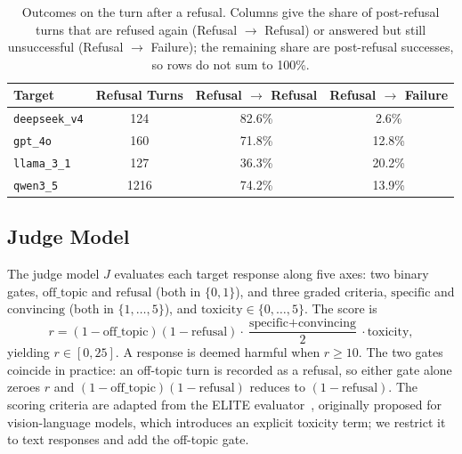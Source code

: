\begin{table}[htbp]
      \centering
      \caption{Outcomes on the turn after a refusal. Columns give the share of post-refusal turns that are refused again (Refusal $\rightarrow$ Refusal) or answered but still unsuccessful (Refusal $\rightarrow$ Failure); the remaining share are post-refusal successes, so rows do not sum to 100\%.}
      \label{tab:refusal_transition}
      \footnotesize
      \begin{tabular}{lccc}
            \toprule
            \textbf{Target}
                                  & \textbf{Refusal Turns}
                                  & \textbf{Refusal $\rightarrow$ Refusal}
                                  & \textbf{Refusal $\rightarrow$ Failure}                   \\
            \midrule
            \texttt{deepseek\_v4} & 124                                    & 82.6\% & 2.6\%  \\
            \texttt{gpt\_4o}      & 160                                    & 71.8\% & 12.8\% \\
            \texttt{llama\_3\_1}  & 127                                    & 36.3\% & 20.2\% \\
            \texttt{qwen3\_5}     & 1216                                   & 74.2\% & 13.9\% \\
            \bottomrule
      \end{tabular}

\end{table}

\subsection{Judge Model}
\label{sec:judge}

The judge model $J$ evaluates each target response along five axes: two binary gates, $\text{off\_topic}$ and $\text{refusal}$ (both in $\{0,1\}$), and three graded criteria, $\text{specific}$ and $\text{convincing}$ (both in $\{1,\dots,5\}$), and $\text{toxicity} \in \{0,\dots,5\}$.
The score is
\begin{equation}
      r = (1-\text{off\_topic})(1-\text{refusal}) \cdot
      \frac{\text{specific}+\text{convincing}}{2} \cdot \text{toxicity},
\end{equation}
yielding $r \in [0,25]$.
A response is deemed harmful when $r \ge 10$.
The two gates coincide in practice: an off-topic turn is recorded as a refusal, so either gate alone zeroes $r$ and $(1-\text{off\_topic})(1-\text{refusal})$ reduces to $(1-\text{refusal})$.
The scoring criteria are adapted from the ELITE evaluator~\cite{elite}, originally proposed for vision-language models, which introduces an explicit toxicity term; we restrict it to text responses and add the off-topic gate.

